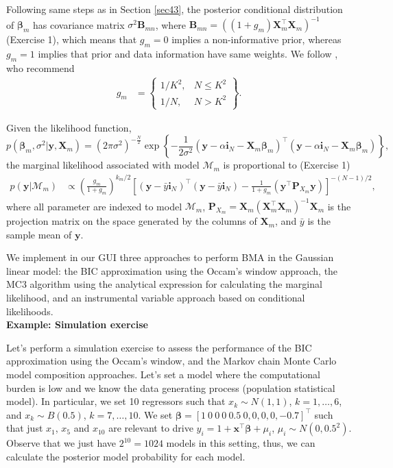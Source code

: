 Following same steps as in Section \ref{sec43}, the posterior conditional distribution of $\bm{\beta}_m$ has covariance matrix $\sigma^2\bm{B}_{mn}$, where $\bm{B}_{mn}=((1+g_m)\bm{X}_m^{\top}\bm{X}_m)^{-1}$ (Exercise 1), which means that $g_m=0$ implies a non-informative prior, whereas $g_m=1$ implies that prior and data information have same weights. We follow \cite{fernandez2001benchmark}, who recommend
\begin{align*}
	g_m & =
	\begin{Bmatrix}
		1/K^2, & N \leq K^2\\
		1/N, & N>K^2 
	\end{Bmatrix}.
\end{align*}  
 
Given the likelihood function, 
\begin{equation*}
	p(\bm{\beta}_m, \sigma^2|\bm{y}, \bm{X}_m) = (2\pi\sigma^2)^{-\frac{N}{2}} \exp \left\{-\frac{1}{2\sigma^2} (\bm{y} - \alpha\bm{i}_N - \bm{X}_m\bm{\beta}_m)^{\top}(\bm{y} - \alpha\bm{i}_N - \bm{X}_m\bm{\beta}_m) \right\},
\end{equation*}
the marginal likelihood associated with model $\mathcal{M}_m$ is proportional to (Exercise 1) 
\begin{align*}
	p(\bm{y}|\mathcal{M}_m)&\propto \left(\frac{g_m}{1+g_m}\right)^{k_m/2} \left[(\bm{y}-\bar{y}\bm{i}_N)^{\top}(\bm{y}-\bar{y}\bm{i}_N)-\frac{1}{1+g_m}(\bm{y}^{\top}\bm{P}_{X_m}\bm{y})\right]^{-(N-1)/2},
\end{align*}
where all parameter are indexed to model $\mathcal{M}_m$, $\bm{P}_{X_m}=\bm{X}_m(\bm{X}_m^{\top}\bm{X}_m)^{-1}\bm{X}_m$ is the projection matrix on the space generated by the columns of $\bm{X}_m$, and $\bar{y}$ is the sample mean of $\bm{y}$.

We implement in our GUI three approaches to perform BMA in the Gaussian linear model: the BIC approximation using the Occam's window approach, the MC3 algorithm using the analytical expression for calculating the marginal likelihood, and an instrumental variable approach based on conditional likelihoods.\\

\textbf{Example: Simulation exercise}

Let's perform a simulation exercise to assess the performance of the BIC approximation using the Occam's window, and the Markov chain Monte Carlo model composition approaches. Let's set a model where the computational burden is low and we know the data generating process (population statistical model). In particular, we set 10 regressors such that $x_k\sim N(1, 1)$, $k =1,\dots,6$, and $x_k\sim B(0.5)$, $k=7,\dots,10$. We set $\bm{\beta}=[1 \ 0 \ 0 \ 0 \ 0.5 \ 0, 0, 0, 0, -0.7]^{\top}$ such that just $x_1$, $x_5$ and $x_{10}$ are relevant to drive $y_i=1+\bm{x}^{\top}\bm{\beta}+\mu_i$, $\mu_i\sim N(0,0.5^2)$. Observe that we just have $2^{10}=1024$ models in this setting, thus, we can calculate the posterior model probability for each model. 

